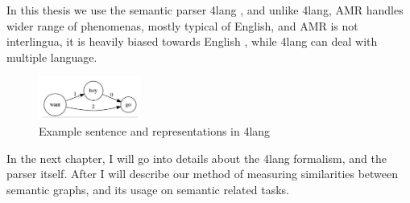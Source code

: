 In this thesis we use the semantic parser 4lang \cite{Recski:2015b}, and unlike 4lang, AMR handles wider range of phenomenas, mostly typical of English, and AMR is not interlingua, it is heavily biased towards English \cite{Palmer:2005}, while 4lang can deal with multiple language.

\begin{figure}[h!]
	\centering
	\includegraphics[width=0.3\textwidth]{figures/4langboy}
	\caption{Example sentence and representations in 4lang}
	\label{fig:4langboy}
\end{figure}

In the next chapter, I will go into details about the 4lang formalism, and the parser itself. After I will describe our method of measuring similarities between semantic graphs, and its usage on semantic related tasks.